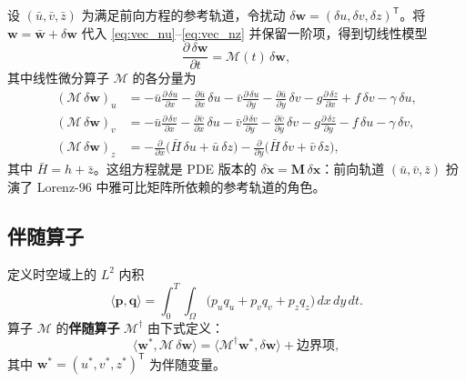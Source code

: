 \documentclass[12pt,a4paper,twoside]{article}
\begin{document}
设 $(\bar u, \bar v, \bar z)$ 为满足前向方程的参考轨道，令扰动 $\delta\mathbf{w} = (\delta u, \delta v, \delta z)^{\mathsf T}$。将 $\mathbf{w} = \bar{\mathbf{w}} + \delta\mathbf{w}$ 代入 \eqref{eq:vec_nu}--\eqref{eq:vec_nz} 并保留一阶项，得到切线性模型
\begin{equation}
    \frac{\partial\,\delta\mathbf{w}}{\partial t} = \mathcal{M}(t)\,\delta\mathbf{w},
    \label{eq:tlm_operator}
\end{equation}
其中线性微分算子 $\mathcal{M}$ 的各分量为
\begin{align}
    (\mathcal{M}\,\delta\mathbf{w})_u &=
    -\bar u\frac{\partial\,\delta u}{\partial x}
    - \frac{\partial\bar u}{\partial x}\,\delta u
    - \bar v\frac{\partial\,\delta u}{\partial y}
    - \frac{\partial\bar u}{\partial y}\,\delta v
    - g\frac{\partial\,\delta z}{\partial x}
    + f\,\delta v - \gamma\,\delta u, \label{eq:tlm_u2} \\[4pt]
    (\mathcal{M}\,\delta\mathbf{w})_v &=
    -\bar u\frac{\partial\,\delta v}{\partial x}
    - \frac{\partial\bar v}{\partial x}\,\delta u
    - \bar v\frac{\partial\,\delta v}{\partial y}
    - \frac{\partial\bar v}{\partial y}\,\delta v
    - g\frac{\partial\,\delta z}{\partial y}
    - f\,\delta u - \gamma\,\delta v, \label{eq:tlm_v2} \\[4pt]
    (\mathcal{M}\,\delta\mathbf{w})_z &=
    -\frac{\partial}{\partial x}\big(\bar H\,\delta u + \bar u\,\delta z\big)
    - \frac{\partial}{\partial y}\big(\bar H\,\delta v + \bar v\,\delta z\big), \label{eq:tlm_z2}
\end{align}
其中 $\bar H = h + \bar z$。这组方程就是 PDE 版本的 $\delta\dot{\mathbf{x}} = \mathbf{M}\,\delta\mathbf{x}$：前向轨道 $(\bar u, \bar v, \bar z)$ 扮演了 Lorenz-96 中雅可比矩阵所依赖的参考轨道的角色。

\subsection{伴随算子}

定义时空域上的 $L^2$ 内积
\begin{equation}
    \langle \mathbf{p}, \mathbf{q} \rangle
    = \int_0^T \int_\Omega \big(p_u q_u + p_v q_v + p_z q_z\big)\,dx\,dy\,dt.
\end{equation}
算子 $\mathcal{M}$ 的\textbf{伴随算子} $\mathcal{M}^\dagger$ 由下式定义：
\begin{equation}
    \langle \mathbf{w}^*, \mathcal{M}\,\delta\mathbf{w} \rangle
    = \langle \mathcal{M}^\dagger \mathbf{w}^*, \delta\mathbf{w} \rangle
    + \text{边界项},
\end{equation}
其中 $\mathbf{w}^* = (u^*, v^*, z^*)^{\mathsf T}$ 为伴随变量。
\end{document}
